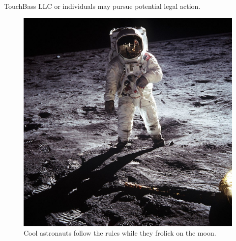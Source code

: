 TouchBass LLC or individuals may pursue potential legal action.

\ifisflight
\vspace*{\fill}
\begin{figure}[!h]
\centering
\includegraphics[width=\textwidth, trim=65 0 55 0, clip]{images/Aldrin_Apollo_11.jpg}
\caption{Cool astronauts follow the rules while they frolick on the moon.}
\label{image:firststep}
\end{figure}
\vspace*{\fill}

\fi